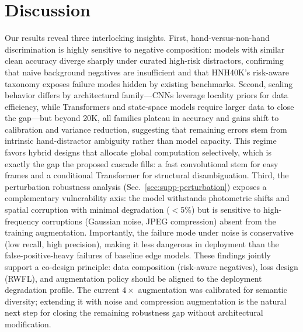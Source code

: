 \documentclass{bmvc2k}
\begin{document}
\section{Discussion}
\label{sec:discussion}

Our results reveal three interlocking insights. First, hand-versus-non-hand discrimination is highly sensitive to negative composition: models with similar clean accuracy diverge sharply under curated high-risk distractors, confirming that naive background negatives are insufficient and that HNH40K's risk-aware taxonomy exposes failure modes hidden by existing benchmarks. Second, scaling behavior differs by architectural family—CNNs leverage locality priors for data efficiency, while Transformers and state-space models require larger data to close the gap—but beyond 20K, all families plateau in accuracy and gains shift to calibration and variance reduction, suggesting that remaining errors stem from intrinsic hand-distractor ambiguity rather than model capacity. This regime favors hybrid designs that allocate global computation selectively, which is exactly the gap the proposed cascade fills: a fast convolutional stem for easy frames and a conditional Transformer for structural disambiguation. Third, the perturbation robustness analysis (Sec.~\ref{sec:supp-perturbation}) exposes a complementary vulnerability axis: the model withstands photometric shifts and spatial corruption with minimal degradation ($<$5\%) but is sensitive to high-frequency corruptions (Gaussian noise, JPEG compression) absent from the training augmentation. Importantly, the failure mode under noise is conservative (low recall, high precision), making it less dangerous in deployment than the false-positive-heavy failures of baseline edge models. These findings jointly support a co-design principle: data composition (risk-aware negatives), loss design (RWFL), and augmentation policy should be aligned to the deployment degradation profile. The current $4{\times}$ augmentation was calibrated for semantic diversity; extending it with noise and compression augmentation is the natural next step for closing the remaining robustness gap without architectural modification.
\end{document}
